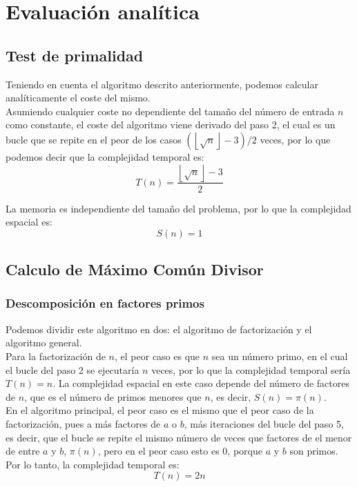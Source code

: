 \section{Evaluación analítica}
\subsection{Test de primalidad}

Teniendo en cuenta el algoritmo descrito anteriormente, podemos calcular analíticamente el coste del mismo.\\
Asumiendo cualquier coste no dependiente del tamaño del número de entrada $n$ como constante, el coste del algoritmo viene derivado del paso 2, el cual es un bucle que se repite en el peor de los casos $(\left \lfloor \sqrt{n} \right \rfloor - 3)/2$ veces, por lo que podemos decir que la complejidad temporal es:
\begin{equation}
    T(n) = \frac{\left \lfloor \sqrt{n} \right \rfloor - 3}{2}
\end{equation}

La memoria es independiente del tamaño del problema, por lo que la complejidad espacial es:
\begin{equation}
    S(n) = 1
\end{equation}


\subsection{Calculo de Máximo Común Divisor}

\subsubsection{Descomposición en factores primos}
Podemos dividir este algoritmo en dos: el algoritmo de factorización y el algoritmo general.\\

Para la factorización de $n$, el peor caso es que $n$ sea un número primo, en el cual el bucle del paso 2 se ejecutaría $n$ veces, por lo que la complejidad temporal sería $T(n) = n$. La complejidad espacial en este caso depende del número de factores de $n$, que es el número de primos menores que $n$, es decir, $S(n) = \pi(n)$.\\

En el algoritmo principal, el peor caso es el mismo que el peor caso de la factorización, pues a más factores de $a$ o $b$, más iteraciones del bucle del paso 5, es decir, que el bucle se repite el mismo número de veces que factores de el menor de entre $a$ y $b$, $\pi(n)$, pero en el peor caso esto es $0$, porque $a$ y $b$ son primos. Por lo tanto, la complejidad temporal es:
\begin{equation}
    T(n) = 2n
\end{equation}

